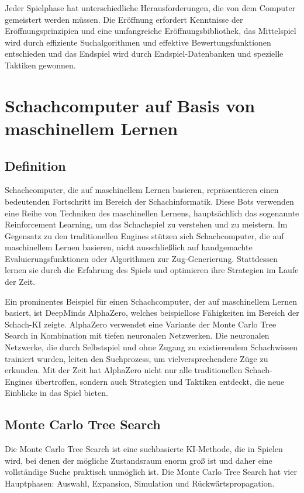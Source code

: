 Jeder Spielphase hat unterschiedliche Herausforderungen, die von dem Computer gemeistert werden müssen. Die Eröffnung erfordert Kenntnisse der 
Eröffnungsprinzipien und eine umfangreiche Eröffnungsbibliothek, das Mittelspiel wird durch effiziente Suchalgorithmen und effektive Bewertungsfunktionen
entschieden und das Endspiel wird durch Endspiel-Datenbanken und spezielle Taktiken gewonnen.

\section{Schachcomputer auf Basis von maschinellem Lernen}

\subsection{Definition}
Schachcomputer, die auf maschinellem Lernen basieren, repräsentieren einen bedeutenden Fortschritt im Bereich der Schachinformatik. 
Diese Bots verwenden eine Reihe von Techniken des maschinellen Lernens, hauptsächlich das sogenannte Reinforcement Learning, 
um das Schachspiel zu verstehen und zu meistern. Im Gegensatz zu den traditionellen Engines stützen sich Schachcomputer, die auf maschinellem Lernen basieren, 
nicht ausschließlich auf handgemachte Evaluierungsfunktionen oder Algorithmen zur Zug-Generierung. 
Stattdessen lernen sie durch die Erfahrung des Spiels und optimieren ihre Strategien im Laufe der Zeit.~\cite{doi:10.1126/science.aar6404}

Ein prominentes Beispiel für einen Schachcomputer, der auf maschinellem Lernen basiert, ist DeepMinds AlphaZero, 
welches beispiellose Fähigkeiten im Bereich der Schach-KI zeigte. AlphaZero verwendet eine Variante der Monte Carlo Tree Search 
in Kombination mit tiefen neuronalen Netzwerken. Die neuronalen Netzwerke, die durch Selbstspiel und ohne Zugang zu existierendem Schachwissen trainiert wurden, 
leiten den Suchprozess, um vielversprechendere Züge zu erkunden. Mit der Zeit hat AlphaZero nicht nur alle traditionellen Schach-Engines übertroffen, 
sondern auch Strategien und Taktiken entdeckt, die neue Einblicke in das Spiel bieten.~\cite{David_Silver_2023_deepmind}

\subsection{Monte Carlo Tree Search}
Die Monte Carlo Tree Search ist eine suchbasierte KI-Methode, die in Spielen wird, bei denen der mögliche Zustandsraum enorm groß ist 
und daher eine vollständige Suche praktisch unmöglich ist. Die Monte Carlo Tree Search hat vier Hauptphasen: Auswahl, 
Expansion, Simulation und Rückwärtspropagation.~\cite{Ziad_Salloum_2019_towardsdatascience}

